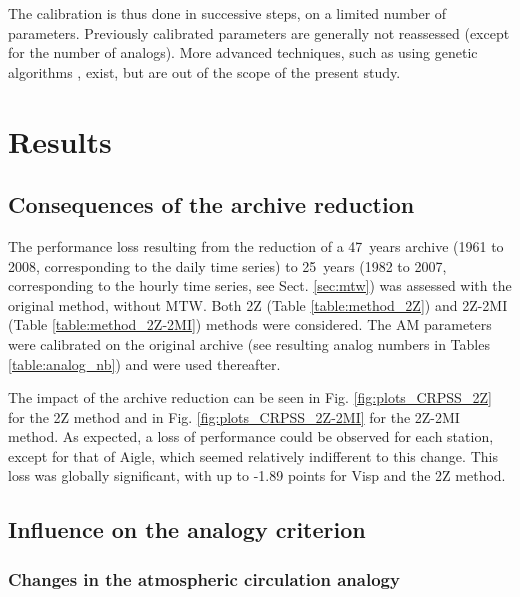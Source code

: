 \documentclass[hess, manuscript]{copernicus}
\begin{document}
The calibration is thus done in successive steps, on a limited number of parameters. Previously calibrated parameters are generally not reassessed (except for the number of analogs). More advanced techniques, such as using genetic algorithms \citep{Horton2016}, exist, but are out of the scope of the present study.


\section{Results}
\label{sec:results}

\subsection{Consequences of the archive reduction}
\label{sec:archive_reduction}

The performance loss resulting from the reduction of a 47~years archive (1961 to 2008, corresponding to the daily time series) to 25~years (1982 to 2007, corresponding to the hourly time series, see Sect. \ref{sec:mtw}) was assessed with the original method, without MTW. Both 2Z (Table \ref{table:method_2Z}) and 2Z-2MI (Table \ref{table:method_2Z-2MI}) methods were considered. The AM parameters were calibrated on the original archive (see resulting analog numbers in Tables \ref{table:analog_nb}) and were used thereafter.

The impact of the archive reduction can be seen in Fig. \ref{fig:plots_CRPSS_2Z} for the 2Z method and in Fig. \ref{fig:plots_CRPSS_2Z-2MI} for the 2Z-2MI method. As expected, a loss of performance could be observed for each station, except for that of Aigle, which seemed relatively indifferent to this change. This loss was globally significant, with up to -1.89 points for Visp and the 2Z method. 


\subsection{Influence on the analogy criterion}
\label{sec:influence_criteria}

\subsubsection{Changes in the atmospheric circulation analogy}
\label{sec:perf_2Z}
\end{document}
